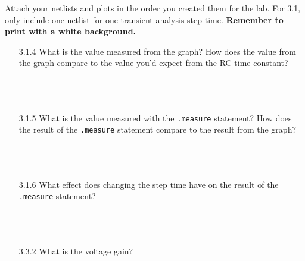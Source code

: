 \documentclass{article}
\begin{document}
\thispagestyle{plain}

\name

Attach your netlists and plots in the order you created them for the lab. For 3.1, only include one netlist for one transient analysis step time. \textbf{Remember to print with a white background.}

\begin{enumerate}
  \item[3.1.4] What is the value measured from the graph? How does the value from the graph compare to the value you'd expect from the RC time constant?
  \\~\\~\\~\\
  \item[3.1.5] What is the value measured with the \texttt{.measure} statement? How does the result of the \texttt{.measure} statement compare to the result from the graph?
  \\~\\~\\~\\
  \item[3.1.6] What effect does changing the step time have on the result of the \texttt{.measure} statement?
  \\~\\~\\~\\
  \item[3.3.2] What is the voltage gain?
\end{enumerate}
\end{document}
